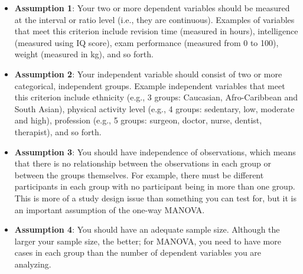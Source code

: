 \documentclass[a4paper,12pt]{article}
\begin{document}
\begin{itemize}
	\item \textbf{Assumption 1}: Your two or more dependent variables should be measured at the interval or ratio level (i.e., they are continuous). Examples of variables that meet this criterion include revision time (measured in hours), intelligence (measured using IQ score), exam performance (measured from 0 to 100), weight (measured in kg), and so forth.\\
	
	\item \textbf{Assumption 2}: Your independent variable should consist of two or more categorical, independent groups. Example independent variables that meet this criterion include ethnicity (e.g., 3 groups: Caucasian, Afro-Caribbean and South Asian), physical activity level (e.g., 4 groups: sedentary, low, moderate and high), profession (e.g., 5 groups: surgeon, doctor, nurse, dentist, therapist), and so forth.\\
	
	\item \textbf{Assumption 3}: You should have independence of observations, which means that there is no relationship between the observations in each group or between the groups themselves. For example, there must be different participants in each group with no participant being in more than one group. This is more of a study design issue than something you can test for, but it is an important assumption of the one-way MANOVA.\\
	
	\item \textbf{Assumption 4}: You should have an adequate sample size. Although the larger your sample size, the better; for MANOVA, you need to have more cases in each group than the number of dependent variables you are analyzing.\\
	

\end{itemize}
\end{document}
